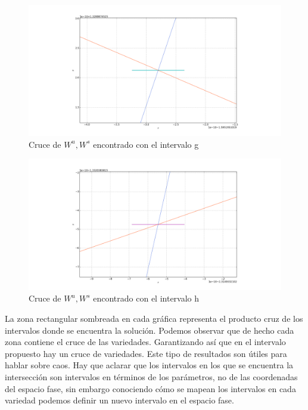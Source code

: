 \begin{figure}[H]
\centering
\includegraphics[scale=0.4]{cruce7}
\caption{Cruce de $W^{u},W^{s}$ encontrado con el intervalo g }
\label{cruce7}
\end{figure}

\begin{figure}[H]
\centering
\includegraphics[scale=0.4]{cruce8}
\caption{Cruce de $W^{u},W^{s}$ encontrado con el intervalo h }
\label{cruce8}
\end{figure}


La zona rectangular sombreada en cada gráfica representa el producto cruz de los intervalos donde se encuentra la solución. Podemos observar que de hecho cada zona contiene el cruce de las variedades. Garantizando así que en el intervalo propuesto hay un cruce de variedades. Este tipo de resultados son útiles para hablar sobre caos. Hay que aclarar que los intervalos en los que se encuentra la intersección son intervalos en términos de los parámetros, no de las coordenadas del espacio fase, sin embargo conociendo cómo se mapean los intervalos en cada variedad podemos definir un nuevo intervalo en el espacio fase. \\


